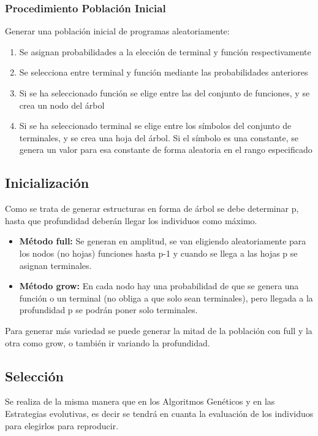 \documentclass[12pt, twoside, openright]{report} %
\begin{document}
\subsubsection{Procedimiento Población Inicial}
Generar una población inicial de programas aleatoriamente:
\begin{enumerate}
	\item Se asignan probabilidades a la elección de terminal y función respectivamente
	\item Se selecciona entre terminal y función mediante las probabilidades anteriores
	\item Si se ha seleccionado función se elige entre las del conjunto de funciones, y se crea un nodo del árbol
	\item Si se ha seleccionado terminal se elige entre los símbolos del conjunto de terminales, y se crea una hoja del árbol. Si el símbolo es una constante, se genera un valor para esa constante de forma aleatoria en el rango especificado
\end{enumerate}

\subsection{Inicialización}
Como se trata de generar estructuras en forma de árbol se debe determinar p, hasta que profundidad deberán llegar los individuos como máximo.
\begin{itemize}
	\item \textbf{Método full:} Se generan en amplitud, se van eligiendo aleatoriamente para los nodos (no hojas) funciones hasta p-1 y cuando se llega a las hojas p se asignan terminales.
	\item \textbf{Método grow:} En cada nodo hay una probabilidad de que se genera una función o un terminal (no obliga a que solo sean terminales), pero llegada a la profundidad p se podrán poner solo terminales.
\end{itemize}
Para generar más variedad se puede generar la mitad de la población con full y la otra como grow, o también ir variando la profundidad.
\vspace{-.5cm}
\subsection{Selección}
Se realiza de la misma manera que en los Algoritmos Genéticos y en las Estrategias evolutivas, es decir se tendrá en cuanta la evaluación de los individuos para elegirlos para reproducir.
\end{document}
